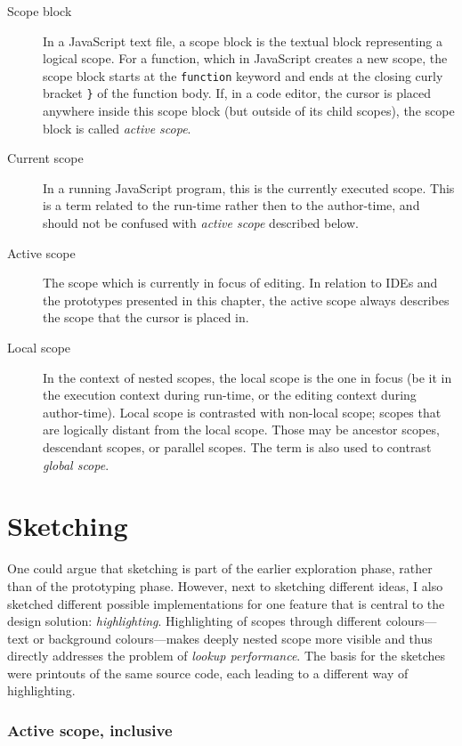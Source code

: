 \begin{description}
\item[Scope block]
In a JavaScript text file, a scope block is the textual block
representing a logical scope. For a function, which in JavaScript
creates a new scope, the scope block starts at the \texttt{function}
keyword and ends at the closing curly bracket \texttt{\}} of the
function body. If, in a code editor, the cursor is placed anywhere
inside this scope block (but outside of its child scopes), the scope
block is called \emph{active scope}.
\item[Current scope]
In a running JavaScript program, this is the currently executed scope.
This is a term related to the run-time rather then to the author-time,
and should not be confused with \emph{active scope} described below.
\item[Active scope]
The scope which is currently in focus of editing. In relation to IDEs
and the prototypes presented in this chapter, the active scope always
describes the scope that the cursor is placed in.
\item[Local scope]
In the context of nested scopes, the local scope is the one in focus (be
it in the execution context during run-time, or the editing context
during author-time). Local scope is contrasted with non-local scope;
scopes that are logically distant from the local scope. Those may be
ancestor scopes, descendant scopes, or parallel scopes. The term is also
used to contrast \emph{global scope}.
\end{description}

\section{Sketching}\label{sketching}

One could argue that sketching is part of the earlier exploration phase,
rather than of the prototyping phase. However, next to sketching
different ideas, I also sketched different possible implementations for
one feature that is central to the design solution: \emph{highlighting}.
Highlighting of scopes through different colours—text or background
colours—makes deeply nested scope more visible and thus directly
addresses the problem of \emph{lookup performance}. The basis for the
sketches were printouts of the same source code, each leading to a
different way of highlighting.

\subsubsection{Active scope, inclusive}\label{active-scope-inclusive}

